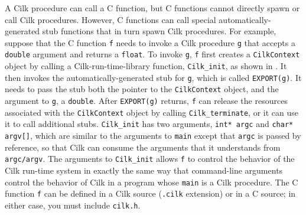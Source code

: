 A Cilk procedure can call a C function, but C functions cannot directly
spawn or call Cilk procedures. However, C functions can call special
automatically-generated stub functions that in turn spawn Cilk procedures.
For example, suppose that the C function \texttt{f} needs to invoke
a Cilk procedure \texttt{g} that accepts a \texttt{double} argument
and returns a \texttt{float}. To invoke \texttt{g}, \texttt{f} first
creates a \texttt{CilkContext} object by calling a Cilk-run-time-library
function, \texttt{Cilk\_init}, as shown in .
It then invokes the automatically-generated
stub for \texttt{g}, which is called \texttt{EXPORT(g)}. It needs to pass
the stub both the pointer to the \texttt{CilkContext} object, and the
argument to \texttt{g}, a \texttt{double}. After
\texttt{EXPORT(g)} returns, \texttt{f} can release the resources
associated with the \texttt{CilkContext} object by calling
\texttt{Cilk\_terminate}, or it can use it to call additional
stubs. \texttt{Cilk\_init} has two arguments, \texttt{int* argc} and
\texttt{char* argv[]}, which are similar to the arguments to
\texttt{main} except that \texttt{argc} is passed by reference, so
that Cilk can consume the arguments that it understands from
\texttt{argc/argv}. The arguments to \texttt{Cilk\_init} allows
\texttt{f} to control the behavior of the Cilk run-time system in
exactly the same way that command-line arguments control the behavior
of Cilk in a program whose \texttt{main} is a Cilk procedure.  The C
function \texttt{f} can be defined in a Cilk source (\texttt{.cilk}
extension) or in a C source; in either case, you must include
\texttt{cilk.h}.

